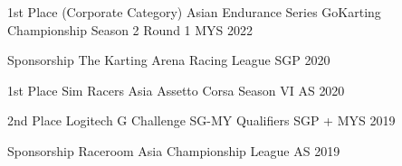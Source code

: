 



\begin{cvhonors}

  \cvhonor
    {1st Place (Corporate Category)} %
    {Asian Endurance Series GoKarting Championship Season 2 Round 1} %
    {MYS} %
    {2022} %
  
  \cvhonor
    {Sponsorship} %
    {The Karting Arena Racing League} %
    {SGP} %
    {2020} %
  
  \cvhonor
    {1st Place} %
    {Sim Racers Asia Assetto Corsa Season VI} %
    {AS} %
    {2020} %

  \cvhonor
    {2nd Place} %
    {Logitech G Challenge SG-MY Qualifiers} %
    {SGP + MYS} %
    {2019} %
  
  \cvhonor
    {Sponsorship} %
    {Raceroom Asia Championship League} %
    {AS} %
    {2019} %

\end{cvhonors}
